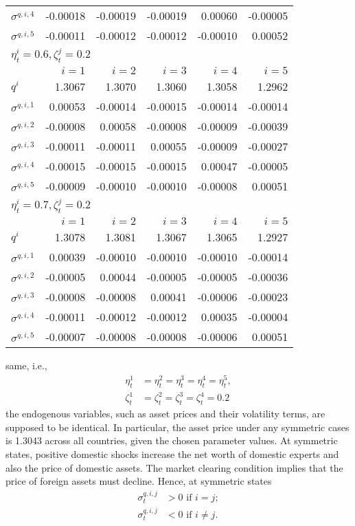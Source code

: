 \documentclass{article}
\begin{document}
\begin{table}[t]
\begin{tabular}{@{}lrrrrr@{}}
$\sigma^{q,i,4}$ & -0.00018 & -0.00019 & -0.00019 & 0.00060 & -0.00005 \\
$\sigma^{q,i,5}$ & -0.00011 & -0.00012 & -0.00012 & -0.00010 & 0.00052 \\
\midrule
\multicolumn{6}{l}{$\eta_{t}^{i}=0.6, \zeta_{t}^{j}=0.2$} \\
& $i=1$ & $i=2$ & $i=3$ & $i=4$ & $i=5$ \\
\midrule
$q^{i}$ & 1.3067 & 1.3070 & 1.3060 & 1.3058 & 1.2962 \\
$\sigma^{q,i,1}$ & 0.00053 & -0.00014 & -0.00015 & -0.00014 & -0.00014 \\
$\sigma^{q,i,2}$ & -0.00008 & 0.00058 & -0.00008 & -0.00009 & -0.00039 \\
$\sigma^{q,i,3}$ & -0.00011 & -0.00011 & 0.00055 & -0.00009 & -0.00027 \\
$\sigma^{q,i,4}$ & -0.00015 & -0.00015 & -0.00015 & 0.00047 & -0.00005 \\
$\sigma^{q,i,5}$ & -0.00009 & -0.00010 & -0.00010 & -0.00008 & 0.00051 \\
\midrule
\multicolumn{6}{l}{$\eta_{t}^{i}=0.7, \zeta_{t}^{j}=0.2$} \\
& $i=1$ & $i=2$ & $i=3$ & $i=4$ & $i=5$ \\
\midrule
$q^{i}$ & 1.3078 & 1.3081 & 1.3067 & 1.3065 & 1.2927 \\
$\sigma^{q,i,1}$ & 0.00039 & -0.00010 & -0.00010 & -0.00010 & -0.00014 \\
$\sigma^{q,i,2}$ & -0.00005 & 0.00044 & -0.00005 & -0.00005 & -0.00036 \\
$\sigma^{q,i,3}$ & -0.00008 & -0.00008 & 0.00041 & -0.00006 & -0.00023 \\
$\sigma^{q,i,4}$ & -0.00011 & -0.00012 & -0.00012 & 0.00035 & -0.00004 \\
$\sigma^{q,i,5}$ & -0.00007 & -0.00008 & -0.00008 & -0.00006 & 0.00051 \\
\bottomrule
\end{tabular}
\label{tab:1}
\end{table}

\clearpage

same, i.e.,
\begin{align*}
\eta_{t}^{1}&=\eta_{t}^{2}=\eta_{t}^{3}=\eta_{t}^{4}=\eta_{t}^{5}, \\
\zeta_{t}^{1}&=\zeta_{t}^{2}=\zeta_{t}^{3}=\zeta_{t}^{4}=0.2
\end{align*}
the endogenous variables, such as asset prices and their volatility terms, are supposed to be identical. In particular, the asset price under any symmetric cases is 1.3043 across all countries, given the chosen parameter values. At symmetric states, positive domestic shocks increase the net worth of domestic experts and also the price of domestic assets. The market clearing condition implies that the price of foreign assets must decline. Hence, at symmetric states
\begin{align*}
\sigma_{t}^{q,i,j}&>0 \text{ if } i=j; \\
\sigma_{t}^{q,i,j}&<0 \text{ if } i\ne j.
\end{align*}
\end{document}
